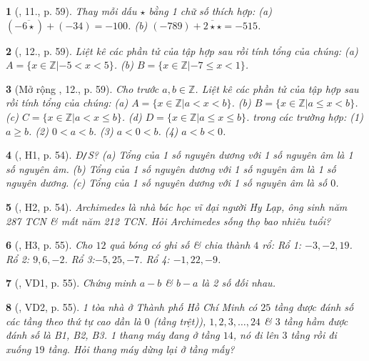 \documentclass{article}
\newtheorem{baitoan}{}
\begin{document}
\begin{baitoan}[\cite{Trong_Toan_6_2021}, 11., p. 59]
	Thay mỗi dấu $\star$ bằng 1 chữ số thích hợp: (a) $(-\overline{6\star}) + (-34) = -100$. (b) $(-789) + \overline{2\star\star} = -515$.
\end{baitoan}

\begin{baitoan}[\cite{Trong_Toan_6_2021}, 12., p. 59]
	Liệt kê các phần tử của tập hợp sau rồi tính tổng của chúng: (a) $A = \{x\in\mathbb{Z}|- 5 < x < 5\}$. (b) $B = \{x\in\mathbb{Z}|-7\le x < 1\}$.
\end{baitoan}

\begin{baitoan}[Mở rộng \cite{Trong_Toan_6_2021}, 12., p. 59]
	Cho trước $a,b\in\mathbb{Z}$. Liệt kê các phần tử của tập hợp sau rồi tính tổng của chúng: (a) $A = \{x\in\mathbb{Z}|a < x < b\}$. (b) $B = \{x\in\mathbb{Z}|a\le x < b\}$. (c) $C = \{x\in\mathbb{Z}|a < x\le b\}$. (d) $D = \{x\in\mathbb{Z}|a\le x\le b\}$. trong các trường hợp: (1) $a\ge b$. (2) $0 < a < b$. (3) $a < 0 < b$. (4) $a < b < 0$.
\end{baitoan}

\begin{baitoan}[\cite{Binh_boi_duong_Toan_6_tap_1}, H1, p. 54]
	{\rm Đ{\tt/}S?} (a) Tổng của 1 số nguyên dương với 1 số nguyên âm là 1 số nguyên âm. (b) Tổng của 1 số nguyên dương với 1 số nguyên âm là 1 số nguyên dương. (c) Tổng của 1 số nguyên dương với 1 số nguyên âm là số $0$.
\end{baitoan}

\begin{baitoan}[\cite{Binh_boi_duong_Toan_6_tap_1}, H2, p. 54]
	Archimedes là nhà bác học vĩ đại người Hy Lạp, ông sinh năm {\rm287 TCN} \& mất năm {\rm212 TCN}. Hỏi Archimedes sống thọ bao nhiêu tuổi?
\end{baitoan}

\begin{baitoan}[\cite{Binh_boi_duong_Toan_6_tap_1}, H3, p. 55]
	Cho $12$ quả bóng có ghi số \& chia thành $4$ rổ: Rổ 1: $-3,-2,19$. Rổ 2: $9,6,-2$. Rổ 3:$-5,25,-7$. Rổ 4: $-1,22,-9$.
\end{baitoan}

\begin{baitoan}[\cite{Binh_boi_duong_Toan_6_tap_1}, VD1, p. 55]
	Chứng minh $a - b$ \& $b - a$ là 2 số đối nhau.
\end{baitoan}

\begin{baitoan}[\cite{Binh_boi_duong_Toan_6_tap_1}, VD2, p. 55]
	1 tòa nhà ở Thành phố Hồ Chí Minh có $25$ tầng được đánh số các tầng theo thứ tự cao dần là $0$ (tầng trệt)), $1,2,3,\ldots,24$ \& $3$ tầng hầm được đánh số là B1, B2, B3. 1 thang máy đang ở tầng $14$, nó đi lên $3$ tầng rồi đi xuống $19$ tầng. Hỏi thang máy dừng lại ở tầng mấy?
\end{baitoan}
\end{document}

